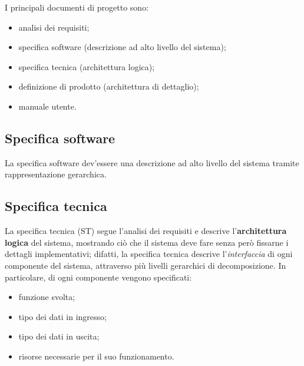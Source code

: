 \documentclass[a4paper]{article}
\begin{document}
		
I principali documenti di progetto sono:
		
	\begin{itemize}
		
			
	\item analisi dei requisiti;
			
	\item specifica software (descrizione ad alto livello del sistema);
			
	\item specifica tecnica (architettura logica);
			
	\item definizione di prodotto (architettura di dettaglio);
			
	\item manuale utente.
		
	\end{itemize}




		
	\subsection{Specifica software}

		
La specifica software dev'essere una descrizione ad alto livello del sistema tramite rappresentazione gerarchica.

		
	\subsection{Specifica tecnica}

		
La specifica tecnica (ST) segue l'analisi dei requisiti e descrive l'\textbf{architettura logica} del sistema, mostrando ciò che il sistema deve fare senza però fissarne i dettagli implementativi; difatti, la specifica tecnica descrive l'\emph{interfaccia} di ogni componente del sistema, attraverso più livelli gerarchici di decomposizione. In particolare, di ogni componente vengono specificati:
		
	\begin{itemize}
		
			
	\item funzione svolta;
			
	\item tipo dei dati in ingresso;
			
	\item tipo dei dati in uscita;
			
	\item risorse necessarie per il suo funzionamento.
		
	\end{itemize}
\end{document}
